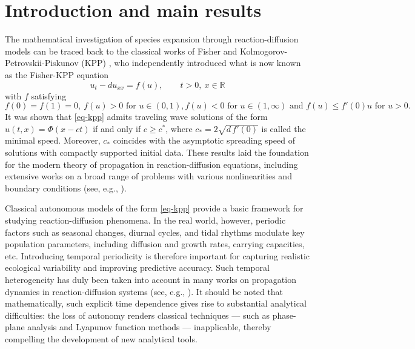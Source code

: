 \documentclass[11pt]{amsart}
\numberwithin{equation}{section}
\begin{document}
\section{Introduction and main results}
The mathematical investigation of species expansion through reaction-diffusion models can be traced back to the classical works of Fisher \cite{Fisher} and Kolmogorov-Petrovskii-Piskunov (KPP) \cite{KPP}, who independently introduced what is now known as the Fisher-KPP equation
\begin{equation}\label{eq-kpp}
  u_t - d u_{xx} = f(u), \qquad  t>0,\ x\in\mathbb R
\end{equation}
with $f$ satisfying 
\[
f(0)=f(1)=0,~ f(u)>0 \text{ for } u\in(0,1), f(u)<0 \text{ for } u\in(1,\infty) \text{ and }f(u) \leq f'(0)u \text{ for } u>0.
\]
It was shown that \eqref{eq-kpp} admits traveling wave solutions of the form \( u(t,x) = \Phi(x - ct) \) if and only if \( c \geq c^* \), where \( c_* =2\sqrt{d\,f'(0)}\) is called the minimal speed. 
Moreover, \( c_* \) coincides with the asymptotic spreading speed of solutions with compactly supported initial data. These results laid the foundation for the modern theory of propagation in reaction-diffusion equations, including extensive works on a broad range of problems with various nonlinearities and boundary conditions (see, e.g., \cite{DL10, DL15,DN,S51, AW78, DM, zlatos, KMY, W82, fife77, DMZ,BLM,FLWW,CDLL,DHL}).

Classical autonomous models of the form \eqref{eq-kpp} provide a basic framework for studying reaction-diffusion phenomena. In the real world, however, periodic factors such as seasonal changes, diurnal cycles, and tidal rhythms modulate key population parameters, including diffusion and growth rates, carrying capacities, etc. Introducing temporal periodicity is therefore important for capturing realistic ecological variability and improving predictive accuracy.  Such temporal heterogeneity has duly  been taken into account in many works on propagation dynamics in reaction-diffusion systems (see, e.g., \cite{SLZ, DDL19, DGP,  Xin, ABC, FZ, wein02, shen11, N099,LLS,W16}). It should be noted that mathematically, such explicit time dependence gives rise to substantial analytical difficulties: the loss of autonomy renders classical techniques — such as phase-plane analysis and Lyapunov function methods — inapplicable, thereby compelling the development of new analytical tools.
\end{document}
